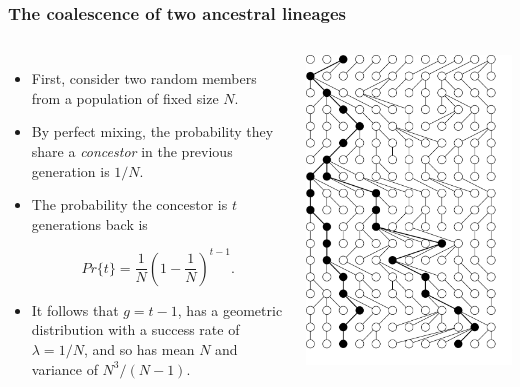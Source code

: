 \begin{frame}
\frametitle{The coalescence of two ancestral lineages}

\begin{columns}


\begin{itemize}
\item First, consider two random members from a population of fixed size $N$. 

\item By perfect mixing, the probability they share a \emph{concestor} in the previous generation is $1/N$. 

\item The probability the concestor is $t$ generations back is 

\begin{equation*}
Pr\{t\} = \frac{1}{N}(1-\frac{1}{N})^{t-1}. 
\end{equation*}

\item It follows that $g=t-1$, has a geometric distribution with a success rate of $\lambda =
1/N$, and so has mean $N$ and variance of $N^3/(N-1)$.
\end{itemize}

\includegraphics[scale=0.25]{../images/wfCoalescent2}


\end{columns}
\end{frame}
